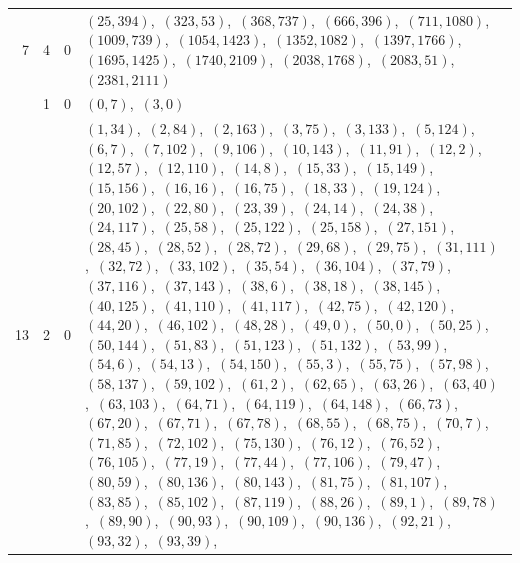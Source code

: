 \documentclass[11pt]{article}
\begin{document}
\begin{longtable}{@{}rrl>{\raggedright\arraybackslash}p{}@{}}
7 & 4 & $0$ & $(25,394)$,\allowbreak\ $(323,53)$,\allowbreak\ $(368,737)$,\allowbreak\ $(666,396)$,\allowbreak\ $(711,1080)$,\allowbreak\ $(1009,739)$,\allowbreak\ $(1054,1423)$,\allowbreak\ $(1352,1082)$,\allowbreak\ $(1397,1766)$,\allowbreak\ $(1695,1425)$,\allowbreak\ $(1740,2109)$,\allowbreak\ $(2038,1768)$,\allowbreak\ $(2083,51)$,\allowbreak\ $(2381,2111)$\\
\addlinespace[3pt]
13 & 1 & $0$ & $(0,7)$,\allowbreak\ $(3,0)$\\
13 & 2 & $0$ & $(1,34)$,\allowbreak\ $(2,84)$,\allowbreak\ $(2,163)$,\allowbreak\ $(3,75)$,\allowbreak\ $(3,133)$,\allowbreak\ $(5,124)$,\allowbreak\ $(6,7)$,\allowbreak\ $(7,102)$,\allowbreak\ $(9,106)$,\allowbreak\ $(10,143)$,\allowbreak\ $(11,91)$,\allowbreak\ $(12,2)$,\allowbreak\ $(12,57)$,\allowbreak\ $(12,110)$,\allowbreak\ $(14,8)$,\allowbreak\ $(15,33)$,\allowbreak\ $(15,149)$,\allowbreak\ $(15,156)$,\allowbreak\ $(16,16)$,\allowbreak\ $(16,75)$,\allowbreak\ $(18,33)$,\allowbreak\ $(19,124)$,\allowbreak\ $(20,102)$,\allowbreak\ $(22,80)$,\allowbreak\ $(23,39)$,\allowbreak\ $(24,14)$,\allowbreak\ $(24,38)$,\allowbreak\ $(24,117)$,\allowbreak\ $(25,58)$,\allowbreak\ $(25,122)$,\allowbreak\ $(25,158)$,\allowbreak\ $(27,151)$,\allowbreak\ $(28,45)$,\allowbreak\ $(28,52)$,\allowbreak\ $(28,72)$,\allowbreak\ $(29,68)$,\allowbreak\ $(29,75)$,\allowbreak\ $(31,111)$,\allowbreak\ $(32,72)$,\allowbreak\ $(33,102)$,\allowbreak\ $(35,54)$,\allowbreak\ $(36,104)$,\allowbreak\ $(37,79)$,\allowbreak\ $(37,116)$,\allowbreak\ $(37,143)$,\allowbreak\ $(38,6)$,\allowbreak\ $(38,18)$,\allowbreak\ $(38,145)$,\allowbreak\ $(40,125)$,\allowbreak\ $(41,110)$,\allowbreak\ $(41,117)$,\allowbreak\ $(42,75)$,\allowbreak\ $(42,120)$,\allowbreak\ $(44,20)$,\allowbreak\ $(46,102)$,\allowbreak\ $(48,28)$,\allowbreak\ $(49,0)$,\allowbreak\ $(50,0)$,\allowbreak\ $(50,25)$,\allowbreak\ $(50,144)$,\allowbreak\ $(51,83)$,\allowbreak\ $(51,123)$,\allowbreak\ $(51,132)$,\allowbreak\ $(53,99)$,\allowbreak\ $(54,6)$,\allowbreak\ $(54,13)$,\allowbreak\ $(54,150)$,\allowbreak\ $(55,3)$,\allowbreak\ $(55,75)$,\allowbreak\ $(57,98)$,\allowbreak\ $(58,137)$,\allowbreak\ $(59,102)$,\allowbreak\ $(61,2)$,\allowbreak\ $(62,65)$,\allowbreak\ $(63,26)$,\allowbreak\ $(63,40)$,\allowbreak\ $(63,103)$,\allowbreak\ $(64,71)$,\allowbreak\ $(64,119)$,\allowbreak\ $(64,148)$,\allowbreak\ $(66,73)$,\allowbreak\ $(67,20)$,\allowbreak\ $(67,71)$,\allowbreak\ $(67,78)$,\allowbreak\ $(68,55)$,\allowbreak\ $(68,75)$,\allowbreak\ $(70,7)$,\allowbreak\ $(71,85)$,\allowbreak\ $(72,102)$,\allowbreak\ $(75,130)$,\allowbreak\ $(76,12)$,\allowbreak\ $(76,52)$,\allowbreak\ $(76,105)$,\allowbreak\ $(77,19)$,\allowbreak\ $(77,44)$,\allowbreak\ $(77,106)$,\allowbreak\ $(79,47)$,\allowbreak\ $(80,59)$,\allowbreak\ $(80,136)$,\allowbreak\ $(80,143)$,\allowbreak\ $(81,75)$,\allowbreak\ $(81,107)$,\allowbreak\ $(83,85)$,\allowbreak\ $(85,102)$,\allowbreak\ $(87,119)$,\allowbreak\ $(88,26)$,\allowbreak\ $(89,1)$,\allowbreak\ $(89,78)$,\allowbreak\ $(89,90)$,\allowbreak\ $(90,93)$,\allowbreak\ $(90,109)$,\allowbreak\ $(90,136)$,\allowbreak\ $(92,21)$,\allowbreak\ $(93,32)$,\allowbreak\ $(93,39)$,\allowbreak\ 
\end{longtable}
\end{document}
